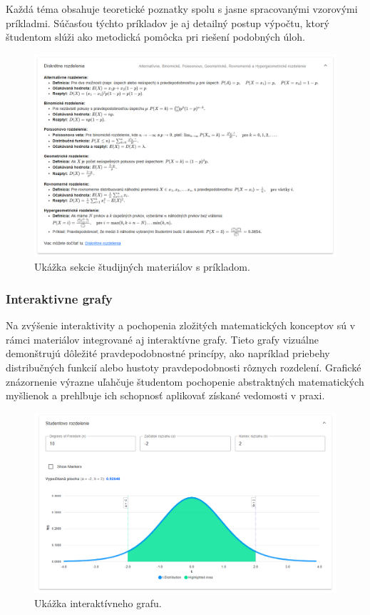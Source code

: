 Každá téma obsahuje teoretické poznatky spolu s jasne spracovanými vzorovými príkladmi. 
Súčasťou týchto príkladov je aj detailný postup výpočtu, ktorý študentom slúži ako metodická pomôcka pri riešení podobných úloh.

\begin{figure}[H]
  \centering
  \includegraphics[width=14cm]{img/materialy.png}
  \caption{Ukážka sekcie študijných materiálov s príkladom.}
  \label{materialy}
  \end{figure}

\subsubsection{Interaktivne grafy}
Na zvýšenie interaktivity a pochopenia zložitých matematických konceptov sú v rámci materiálov integrované aj interaktívne grafy. 
Tieto grafy vizuálne demonštrujú dôležité pravdepodobnostné princípy, ako napríklad priebehy distribučných funkcií alebo hustoty pravdepodobnosti rôznych rozdelení. 
Grafické znázornenie výrazne uľahčuje študentom pochopenie abstraktných matematických myšlienok a prehlbuje ich schopnosť aplikovať získané vedomosti v praxi.
\begin{figure}[H]
  \centering
  \includegraphics[width=14cm]{img/grafy.png}
  \caption{Ukážka interaktívneho grafu.}
  \label{grafy}
  \end{figure}

